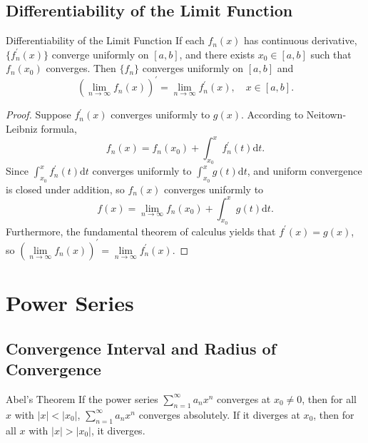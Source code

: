 \subsection{Differentiability of the Limit Function}

\begin{theorem}{Differentiability of the Limit Function}{}
  If each $f_n(x)$ has continuous derivative,
  $\{f_n^{\prime}(x)\}$ converge uniformly on $[a, b]$,
  and there exists $x_0 \in [a, b]$ such that $f_n(x_0)$ converges.
  Then $\{f_n\}$ converges uniformly on $[a, b]$ and
  \begin{equation}
    (\lim \limits _{n \rightarrow \infty} f_n(x))^{\prime}
    = \lim \limits _{n \rightarrow \infty} f_n^{\prime}(x), \quad x \in [a, b].
  \end{equation}
\end{theorem}

\begin{proof}
  Suppose $f_n^{\prime}(x)$ converges uniformly to $g(x)$.
  According to Neitown-Leibniz formula,
  \begin{equation}
    f_n(x) = f_n(x_0) + \int_{x_0}^x f_n^{\prime}(t)\mathrm{d}t.
  \end{equation}
  Since $\int_{x_0}^xf_n^{\prime}(t)\mathrm{d} t$ converges uniformly
  to $\int_{x_0}^xg(t)\mathrm{d} t$,
  and uniform convergence is closed under addition, so $f_n(x)$ converges
  uniformly to
  \begin{equation}
    f(x) = \lim \limits _{n \rightarrow \infty} f_n(x_0) + \int_{x_0}^xg(t)\mathrm{d} t.
  \end{equation}
  Furthermore, the fundamental theorem of calculus yields that $f^{\prime}(x) = g(x)$,
  so $(\lim \limits _{n \rightarrow \infty} f_n(x))^{\prime} = \lim \limits _{n \rightarrow \infty} f_n^{\prime}(x)$.
\end{proof}

\section{Power Series}

\subsection{Convergence Interval and Radius of Convergence}

\begin{theorem}{Abel's Theorem}{}
  If the power series $\sum\limits_{n = 1}^{\infty} a_nx^n$
  converges at $x_0 \neq 0$,
  then for all $x$ with $|x| < |x_0|$,
  $\sum\limits_{n = 1}^{\infty} a_nx^n$ converges absolutely.
  If it diverges at $x_0$,
  then for all $x$ with $|x| > |x_0|$, it diverges.
\end{theorem}

